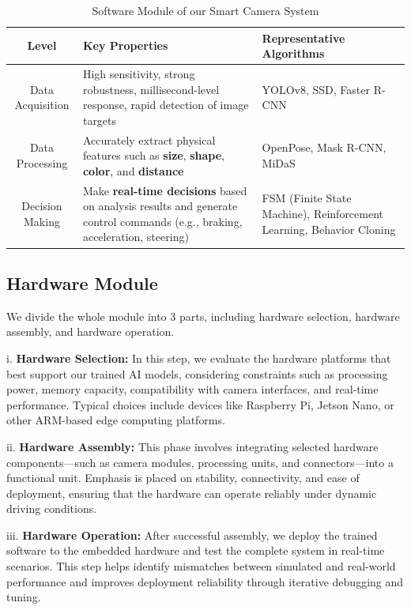 \documentclass[journal,transmag]{IEEEtran}
\begin{document}
\begin{table}[t]
\centering
\caption{Software Module of our Smart Camera System}
\label{tab:Software Module of our Smart Camera System}
\begin{tabular}{|c|p{7.5cm}|p{5.5cm}|}  
\hline
\textbf{Level} & \textbf{Key Properties} & \textbf{Representative Algorithms} \\
\hline
Data Acquisition & High sensitivity, strong robustness, millisecond-level response, rapid detection of image targets & YOLOv8, SSD, Faster R-CNN \\
\hline
Data Processing & Accurately extract physical features such as \textbf{size}, \textbf{shape}, \textbf{color}, and \textbf{distance} & OpenPose, Mask R-CNN, MiDaS \\
\hline
Decision Making & Make \textbf{real-time decisions} based on analysis results and generate control commands (e.g., braking, acceleration, steering) & FSM (Finite State Machine), Reinforcement Learning, Behavior Cloning \\
\hline
\end{tabular}
\end{table}

\subsection{Hardware Module}
We divide the whole module into 3 parts, including hardware selection, hardware assembly, and hardware operation. 

i. \textbf{Hardware Selection: }In this step, we evaluate the hardware platforms that best support our trained AI models, considering constraints such as processing power, memory capacity, compatibility with camera interfaces, and real-time performance. Typical choices include devices like Raspberry Pi, Jetson Nano, or other ARM-based edge computing platforms.

ii. \textbf{Hardware Assembly: }This phase involves integrating selected hardware components—such as camera modules, processing units, and connectors—into a functional unit. Emphasis is placed on stability, connectivity, and ease of deployment, ensuring that the hardware can operate reliably under dynamic driving conditions.

iii. \textbf{Hardware Operation: } After successful assembly, we deploy the trained software to the embedded hardware and test the complete system in real-time scenarios. This step helps identify mismatches between simulated and real-world performance and improves deployment reliability through iterative debugging and tuning.
\end{document}
